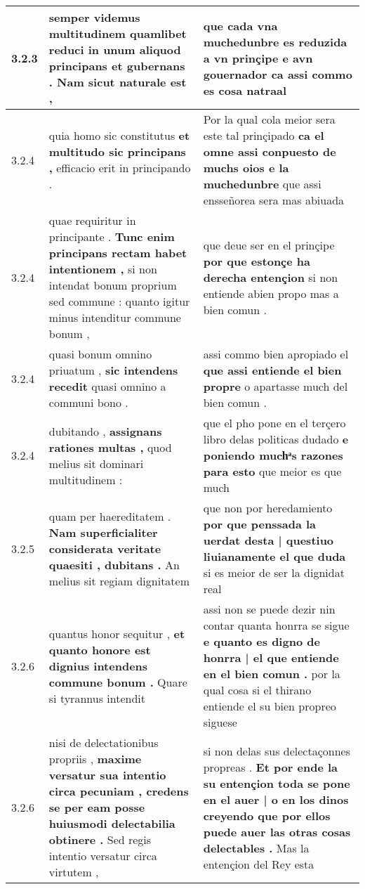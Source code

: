 \begin{tabular}{|p{1cm}|p{6.5cm}|p{6.5cm}|}
3.2.3 & semper videmus multitudinem quamlibet reduci \textbf{ in unum aliquod principans et gubernans . } Nam sicut naturale est , & que cada vna muchedunbre es reduzida a vn prinçipe \textbf{ e avn gouernador } ca assi commo es cosa natraal \\\hline
3.2.4 & quia homo sic constitutus \textbf{ et multitudo sic principans , } efficacio erit in principando . & Por la qual cola meior sera este tal prinçipado \textbf{ ca el omne assi conpuesto de muchs oios e la muchedunbre } que assi ensseñorea sera mas abiuada \\\hline
3.2.4 & quae requiritur in principante . \textbf{ Tunc enim principans rectam habet intentionem , } si non intendat bonum proprium sed commune : quanto igitur minus intenditur commune bonum , & que deue ser en el prinçipe \textbf{ por que estonçe ha derecha entençion } si non entiende abien propo mas a bien comun . \\\hline
3.2.4 & quasi bonum omnino priuatum , \textbf{ sic intendens recedit } quasi omnino a communi bono . & assi commo bien apropiado el \textbf{ que assi entiende el bien propre } o apartasse much del bien comun . \\\hline
3.2.4 & dubitando , \textbf{ assignans rationes multas , } quod melius sit dominari multitudinem : & que el pho pone en el terçero libro delas politicas dudado \textbf{ e poniendo muchͣs razones para esto } que meior es que much \\\hline
3.2.5 & quam per haereditatem . \textbf{ Nam superficialiter considerata veritate quaesiti , dubitans . } An melius sit regiam dignitatem & que non por heredamiento \textbf{ por que penssada la uerdat desta | questiuo liuianamente el que duda } si es meior de ser la dignidat real \\\hline
3.2.6 & quantus honor sequitur , \textbf{ et quanto honore est dignius intendens commune bonum . } Quare si tyrannus intendit & assi non se puede dezir nin contar quanta honrra se sigue \textbf{ e quanto es digno de honrra | el que entiende en el bien comun . } por la qual cosa si el thirano entiende el su bien propreo siguese \\\hline
3.2.6 & nisi de delectationibus propriis , \textbf{ maxime versatur sua intentio circa pecuniam , credens se per eam posse huiusmodi delectabilia obtinere . } Sed regis intentio versatur circa virtutem , & si non delas sus delectaçonnes propreas . \textbf{ Et por ende la su entençion toda se pone en el auer | o en los dinos creyendo que por ellos puede auer las otras cosas delectables . } Mas la entençion del Rey esta \\\hline

\end{tabular}
